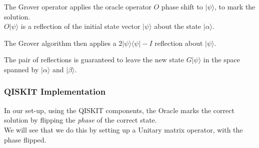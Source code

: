 The Grover operator applies the oracle operator \(O\) phase shift to
\(|\psi\rangle\), to mark the solution.\\
\(O|\psi\rangle\) is a reflection of the initial state vector
\(|\psi\rangle\) about the state \(|\alpha\rangle\).

The Grover algorithm then applies a \(2|\psi\rangle\langle\psi| - I\)
reflection about \(|\psi\rangle\).

The pair of reflections is guaranteed to leave the new state
\(G|\psi\rangle\) in the space spanned by \(|\alpha\rangle\) and
\(|\beta\rangle\).

    \hypertarget{qiskit-implementation}{%
\subsubsection*{QISKIT Implementation}\label{qiskit-implementation}}

In our set-up, using the QISKIT components, the Oracle marks the correct
solution by flipping the \emph{phase} of the correct state.\\
We will see that we do this by setting up a Unitary matrix operator,
with the phase flipped.


